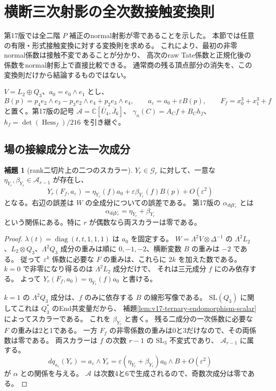 \documentclass[a4paper,11pt]{ltjsarticle}
\theoremstyle{definition}
\newtheorem{lemma}[theorem]{補題}
\begin{document}
\section{横断三次射影の全次数接触変換則}
\label{sec:v18-normal-contact-functoriality}

第17版では全二階 $P$ 補正のnormal射影が零であることを示した。
本節では任意の有限・形式接触変換に対する変換則を求める。
これにより、最初の非零normal係数は接触不変であることが分かり、
高次のraw Tate係数と正規化後の係数をnormal射影上で直接比較できる。
通常商の残る頂点部分の消失を、この変換則だけから結論するものではない。

$V=L_2\oplus Q_3$、$a_0=e_0\wedge e_1$ とし、
\[
 B(p)=p_4e_2\wedge e_3-p_3e_2\wedge e_4+p_2e_3\wedge e_4,
 \qquad a_\varepsilon=a_0+\varepsilon B(p),
 \qquad F_f=x_0^3+x_1^3+f
\]
と置く。第17版の記号
$\mathcal A=\mathbb C[\overline U_4,\overline J_6]$、
$\gamma_n(C)=A_Cf+B_Ch_f$、$h_f=\det(\operatorname{Hess}_f)/216$
を引き継ぐ。

\subsection{場の接線成分と法一次成分}

\begin{lemma}[rank二切片上の二つのスカラー]
\label{lem:v18-two-normal-field-scalars}
$Y_r\in\mathcal G_r$ に対して、一意な
$\eta_{Y_r},\beta_{Y_r}\in\mathcal A_{r-1}$ が存在し、
\begin{equation}\label{eq:v18-two-normal-field-scalars}
 Y_r(F_f,a_\varepsilon)
   =\eta_{Y_r}(f)a_0
     +\varepsilon\beta_{Y_r}(f)B(p)+O(\varepsilon^2)
\end{equation}
となる。右辺の誤差は $W$ の全成分についての誤差である。
第17版の $\alpha_{dqY_r}$ とは
\[
 \alpha_{dqY_r}=\eta_{Y_r}+\beta_{Y_r}
\]
という関係にある。特に $r$ が偶数なら両スカラーは零である。
\end{lemma}

\begin{proof}
$\lambda(t)=\operatorname{diag}(t,t,1,1,1)$ は $a_0$ を固定する。
$W=\Lambda^2V\otimes\Delta^{-1}$ の
$\Lambda^2L_2$、$L_2\otimes Q_3$、$\Lambda^2Q_3$ 成分の重みは順に
$0,-1,-2$、横断変数 $B$ の重みは $-2$ である。
従って $\varepsilon^k$ 係数に必要な $F$ の重みは、これらに $2k$ を加えた数である。
$k=0$ で非零になり得るのは $\Lambda^2L_2$ 成分だけで、
それは三元成分 $f$ にのみ依存する。
よって $Y_r(F_f,a_0)=\eta_{Y_r}(f)a_0$ と書ける。

$k=1$ の $\Lambda^2Q_3$ 成分は、$f$ のみに依存する $B$ の線形写像である。
$\mathrm{SL}(Q_3)$ に関してこれは $Q_3^*$ のEnd共変量だから、
補題\ref{lem:v17-ternary-endomorphism-scalar}によってスカラーである。
これを $\beta_{Y_r}$ と書く。
残る二成分の一次係数に必要な $F$ の重みは2と1である。
一方 $F_f$ の非零係数の重みは0と3だけなので、その両係数は零である。
両スカラーは $f$ の次数 $r-1$ の $\mathrm{SL}_3$ 不変式であり、
$\mathcal A_{r-1}$ に属する。
\[
 dq_{a_\varepsilon}(Y_r)
   =a_\varepsilon\wedge Y_r
   =\varepsilon(\eta_{Y_r}+\beta_{Y_r})a_0\wedge B+O(\varepsilon^2)
\]
が $\alpha$ との関係を与える。
$\mathcal A$ は次数4と6で生成されるので、奇数次成分は零である。
\end{proof}
\end{document}
